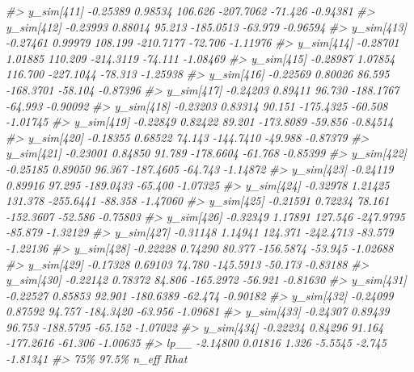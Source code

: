 \documentclass[
  10pt,
  italian,
  a4paper,
  extrafontsizes,onecolumn,openright
  ]{memoir}
\newenvironment{Shaded}{\begin{snugshade}}{\end{snugshade}}
\newcommand{\CommentTok}[1]{\textcolor[rgb]{0.56,0.35,0.01}{\textit{#1}}}
\begin{document}
\begin{Shaded}
\begin{Highlighting}[]
\CommentTok{\#\textgreater{} y\_sim[411] {-}0.25389 0.98534 106.626 {-}207.7062 {-}71.426 {-}0.94381}
\CommentTok{\#\textgreater{} y\_sim[412] {-}0.23993 0.88014  95.213 {-}185.0513 {-}63.979 {-}0.96594}
\CommentTok{\#\textgreater{} y\_sim[413] {-}0.27461 0.99979 108.199 {-}210.7177 {-}72.706 {-}1.11976}
\CommentTok{\#\textgreater{} y\_sim[414] {-}0.28701 1.01885 110.209 {-}214.3119 {-}74.111 {-}1.08469}
\CommentTok{\#\textgreater{} y\_sim[415] {-}0.28987 1.07854 116.700 {-}227.1044 {-}78.313 {-}1.25938}
\CommentTok{\#\textgreater{} y\_sim[416] {-}0.22569 0.80026  86.595 {-}168.3701 {-}58.104 {-}0.87396}
\CommentTok{\#\textgreater{} y\_sim[417] {-}0.24203 0.89411  96.730 {-}188.1767 {-}64.993 {-}0.90092}
\CommentTok{\#\textgreater{} y\_sim[418] {-}0.23203 0.83314  90.151 {-}175.4325 {-}60.508 {-}1.01745}
\CommentTok{\#\textgreater{} y\_sim[419] {-}0.22849 0.82422  89.201 {-}173.8089 {-}59.856 {-}0.84514}
\CommentTok{\#\textgreater{} y\_sim[420] {-}0.18355 0.68522  74.143 {-}144.7410 {-}49.988 {-}0.87379}
\CommentTok{\#\textgreater{} y\_sim[421] {-}0.23001 0.84850  91.789 {-}178.6604 {-}61.768 {-}0.85399}
\CommentTok{\#\textgreater{} y\_sim[422] {-}0.25185 0.89050  96.367 {-}187.4605 {-}64.743 {-}1.14872}
\CommentTok{\#\textgreater{} y\_sim[423] {-}0.24119 0.89916  97.295 {-}189.0433 {-}65.400 {-}1.07325}
\CommentTok{\#\textgreater{} y\_sim[424] {-}0.32978 1.21425 131.378 {-}255.6441 {-}88.358 {-}1.47060}
\CommentTok{\#\textgreater{} y\_sim[425] {-}0.21591 0.72234  78.161 {-}152.3607 {-}52.586 {-}0.75803}
\CommentTok{\#\textgreater{} y\_sim[426] {-}0.32349 1.17891 127.546 {-}247.9795 {-}85.879 {-}1.32129}
\CommentTok{\#\textgreater{} y\_sim[427] {-}0.31148 1.14941 124.371 {-}242.4713 {-}83.579 {-}1.22136}
\CommentTok{\#\textgreater{} y\_sim[428] {-}0.22228 0.74290  80.377 {-}156.5874 {-}53.945 {-}1.02688}
\CommentTok{\#\textgreater{} y\_sim[429] {-}0.17328 0.69103  74.780 {-}145.5913 {-}50.173 {-}0.83188}
\CommentTok{\#\textgreater{} y\_sim[430] {-}0.22142 0.78372  84.806 {-}165.2972 {-}56.921 {-}0.81630}
\CommentTok{\#\textgreater{} y\_sim[431] {-}0.22527 0.85853  92.901 {-}180.6389 {-}62.474 {-}0.90182}
\CommentTok{\#\textgreater{} y\_sim[432] {-}0.24099 0.87592  94.757 {-}184.3420 {-}63.956 {-}1.09681}
\CommentTok{\#\textgreater{} y\_sim[433] {-}0.24307 0.89439  96.753 {-}188.5795 {-}65.152 {-}1.07022}
\CommentTok{\#\textgreater{} y\_sim[434] {-}0.22234 0.84296  91.164 {-}177.2616 {-}61.306 {-}1.00635}
\CommentTok{\#\textgreater{} lp\_\_       {-}2.14800 0.01816   1.326   {-}5.5545  {-}2.745 {-}1.81341}
\CommentTok{\#\textgreater{}               75\%   97.5\% n\_eff Rhat}

\end{Highlighting}
\end{Shaded}
\end{document}
